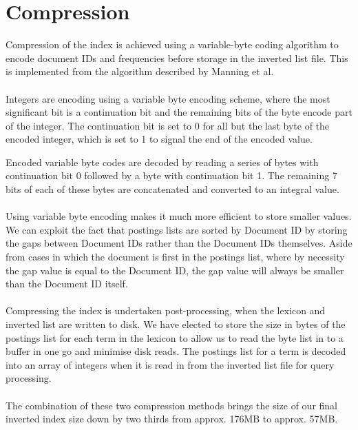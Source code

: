 
\section{Compression}
\label{sec:compression}

Compression of the index is achieved using a variable-byte coding algorithm to encode document IDs and frequencies before storage in the inverted list file. This is implemented from the algorithm described by Manning et al.\,\cite[p. 96-98]{manning2008introduction}

\paragraph{}
Integers are encoding using a variable byte encoding scheme, where the most significant bit is a continuation bit and the remaining bits of the byte encode part of the integer. The continuation bit is set to 0 for all but the last byte of the encoded integer, which is set to 1 to signal the end of the encoded value.

Encoded variable byte codes are decoded by reading a series of bytes with continuation bit 0 followed by a byte with continuation bit 1. The remaining 7 bits of each of these bytes are concatenated and converted to an integral value.

\paragraph{}
Using variable byte encoding makes it much more efficient to store smaller values. We can exploit the fact that postings lists are sorted by Document ID by storing the gaps between Document IDs rather than the Document IDs themselves. Aside from cases in which the document is first in the postings list, where by necessity the gap value is equal to the Document ID, the gap value will always be smaller than the Document ID itself.

\paragraph{}
Compressing the index is undertaken post-processing, when the lexicon and inverted list are written to disk. We have elected to store the size in bytes of the postings list for each term in the lexicon to allow us to read the byte list in to a buffer in one go and minimise disk reads. The postings list for a term is decoded into an array of integers when it is read in from the inverted list file for query processing.

\paragraph{}
The combination of these two compression methods brings the size of our final inverted index size down by two thirds from approx. 176MB to approx. 57MB.
